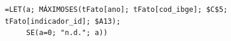 \begin{verbatim}
=LET(a; MÁXIMOSES(tFato[ano]; tFato[cod_ibge]; $C$5; tFato[indicador_id]; $A13);
     SE(a=0; "n.d."; a))
\end{verbatim}
